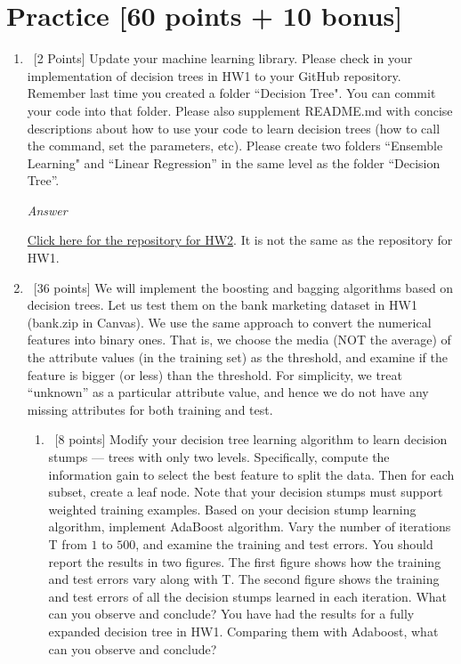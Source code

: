 \documentclass[12pt, fullpage,letterpaper]{article}
\begin{document}
\section{Practice [60 points + 10 bonus]}
\begin{enumerate}
	\item~[2 Points] Update your machine learning library. Please check in your implementation of decision trees in HW1 to your GitHub repository. Remember last time you created a folder ``Decision Tree". You can commit your code into that folder. Please also supplement README.md with concise descriptions about how to use your code to learn decision trees (how to call the command, set the parameters, etc). Please create two folders ``Ensemble Learning" and ``Linear Regression''  in the same level as the folder ``Decision Tree''.  
	
	\emph{Answer}
	
	\href{https://github.com/Paul-Wissler/cs-6350-hw2}{Click here for the repository for HW2}. It is not the same as the repository for HW1.

\item~[36 points] We will implement the boosting and bagging algorithms based on decision trees.  Let us test them on the bank marketing dataset in HW1 (bank.zip in Canvas). We use the same approach to convert the numerical features into binary ones. That is, we choose the media (NOT the average) of the attribute values (in the training set) as the threshold, and examine if the feature is bigger (or less) than the threshold.  For simplicity, we treat ``unknown'' as a particular attribute value, and hence we do not have any missing attributes for both training and test.
\begin{enumerate}
	\item~[8 points] Modify your decision tree learning algorithm to learn decision stumps ---  trees with only two levels. Specifically, compute the information gain to select the best feature to split the data. Then for each subset, create a leaf node. Note that your decision stumps must support weighted training examples. Based on your decision stump learning algorithm, implement AdaBoost algorithm. Vary the number of iterations T from $1$ to $500$, and examine the training and test errors. You should report the results in two figures. The first figure shows how the training and test errors vary along with T. The second figure shows  the training and test errors of all the decision stumps learned in each iteration. What can you observe and conclude? You have had the results for a fully expanded decision tree in HW1. Comparing them with Adaboost, what can you observe and conclude?
	

\end{enumerate}
\end{enumerate}
\end{document}
